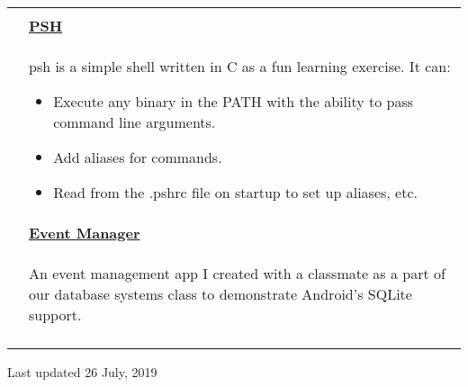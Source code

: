 \documentclass[letterpaper,11pt,oneside]{article}
\begin{document}
\begin{tabularx}{\textwidth}{l X}
    & \\
    & \vspace{-3ex} \textbf{\href{https://github.com/prati0100/psh}{PSH}} \\
    & \vspace{-1.5ex} psh is a simple shell written in C as a fun learning exercise. It can:
    \begin{itemize}[label={--}]
    \setlength\itemsep{-0.25em}
        \item Execute any binary in the PATH with the ability to pass command line arguments.
        \item Add aliases for commands.
        \item Read from the .pshrc file on startup to set up aliases, etc.
    \end{itemize} \\
    & \vspace{-3ex}\textbf{\href{https://github.com/prati0100/EventManager}{Event Manager}} \\
    & \vspace{-2.5ex}\begin{adjustwidth}{}{}An event management app I created with a classmate as a part of our database systems class to demonstrate Android's SQLite support.\end{adjustwidth} \\
    & \\
\end{tabularx}

\centerline{Last updated 26 July, 2019}
\end{document}
